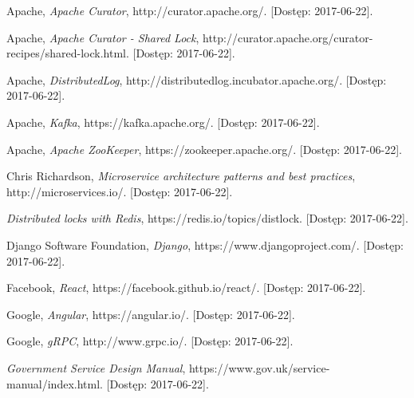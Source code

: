 \documentclass[licencjacka]{pracamgr}
\begin{document}


\begin{thebibliography}{99}

 Apache, \textit{Apache Curator},
http://curator.apache.org/. [Dostęp: 2017-06-22].

 Apache, \textit{Apache Curator - Shared Lock},
http://curator.apache.org/curator-recipes/shared-lock.html. [Dostęp: 2017-06-22].

 Apache, \textit{DistributedLog},
http://distributedlog.incubator.apache.org/. [Dostęp: 2017-06-22].

 Apache, \textit{Kafka},
https://kafka.apache.org/. [Dostęp: 2017-06-22].

 Apache, \textit{Apache ZooKeeper},
https://zookeeper.apache.org/. [Dostęp: 2017-06-22].

 Chris Richardson, \textit{Microservice architecture patterns and best practices},
http://microservices.io/. [Dostęp: 2017-06-22].

 \textit{Distributed locks with Redis},
https://redis.io/topics/distlock. [Dostęp: 2017-06-22].

 Django Software Foundation, \textit{Django},
https://www.djangoproject.com/. [Dostęp: 2017-06-22].

 Facebook, \textit{React},
https://facebook.github.io/react/. [Dostęp: 2017-06-22].

 Google, \textit{Angular},
https://angular.io/. [Dostęp: 2017-06-22].

 Google, \textit{gRPC},
http://www.grpc.io/. [Dostęp: 2017-06-22].

 \textit{Government Service Design Manual},
https://www.gov.uk/service-manual/index.html. [Dostęp: 2017-06-22].


\end{thebibliography}
\end{document}
